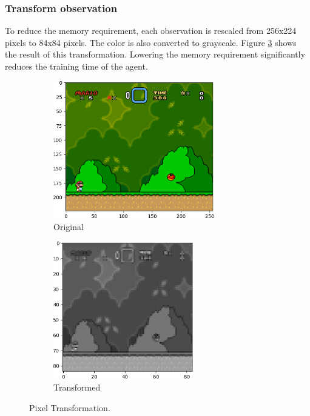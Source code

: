 \documentclass[11pt,a4paper]{article}
\begin{document}
\subsubsection{Transform observation}
To reduce the memory requirement, each observation is rescaled from 256x224 pixels to 84x84 pixels.
The color is also converted to grayscale.
Figure \ref{fig:transformation} shows the result of this transformation.
Lowering the memory requirement significantly reduces the training time of the agent.
\begin{figure}[htbp]
    \centering
    \begin{subfigure}{.5\textwidth}
        \centering
        \includegraphics[height=6cm]{original_crop}
        \caption{Original}
        \label{fig:sub1}
    \end{subfigure}%
    \begin{subfigure}{.5\textwidth}
        \centering
        \includegraphics[height=6cm]{grayscale_crop}
        \caption{Transformed}
        \label{fig:sub2}
    \end{subfigure}
    \caption{Pixel Transformation.}
    \label{fig:transformation}
\end{figure}
\end{document}
